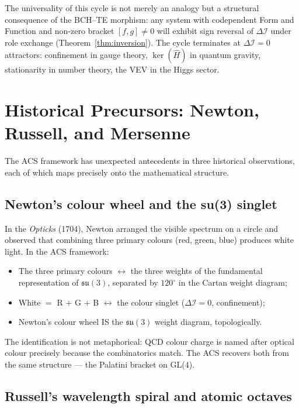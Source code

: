 \documentclass[11pt,a4paper]{article}
\theoremstyle{plain}
\theoremstyle{definition}
\theoremstyle{remark}
\newcommand{\DI}{\Delta\mathcal{I}}
\begin{document}
The universality of this cycle is not merely an analogy but a structural
consequence of the BCH--TE morphism: any system with codependent
Form and Function and non-zero bracket $[f, g] \neq 0$ will exhibit
sign reversal of $\DI$ under role exchange (Theorem~\ref{thm:inversion}).
The cycle terminates at $\DI = 0$ attractors: confinement in gauge
theory, $\ker(\hat{H})$ in quantum gravity, stationarity in number
theory, the VEV in the Higgs sector.

\appendix

\section{Historical Precursors: Newton, Russell, and Mersenne}
\label{sec:history}

The ACS framework has unexpected antecedents in three historical
observations, each of which maps precisely onto the mathematical structure.

\subsection{Newton's colour wheel and the su(3) singlet}

In the \textit{Opticks} (1704), Newton arranged the visible spectrum on a
circle and observed that combining three primary colours (red, green, blue)
produces white light.  In the ACS framework:
\begin{itemize}[noitemsep]
  \item The three primary colours $\leftrightarrow$ the three weights of the
    fundamental representation of $\mathfrak{su}(3)$, separated by $120^\circ$
    in the Cartan weight diagram;
  \item White $=$ R $+$ G $+$ B $\leftrightarrow$ the colour singlet
    ($\DI = 0$, confinement);
  \item Newton's colour wheel IS the $\mathfrak{su}(3)$ weight diagram,
    topologically.
\end{itemize}
The identification is not metaphorical: QCD colour charge is named after
optical colour precisely because the combinatorics match.  The ACS recovers
both from the same structure --- the Palatini bracket on GL(4).

\subsection{Russell's wavelength spiral and atomic octaves}
\end{document}
